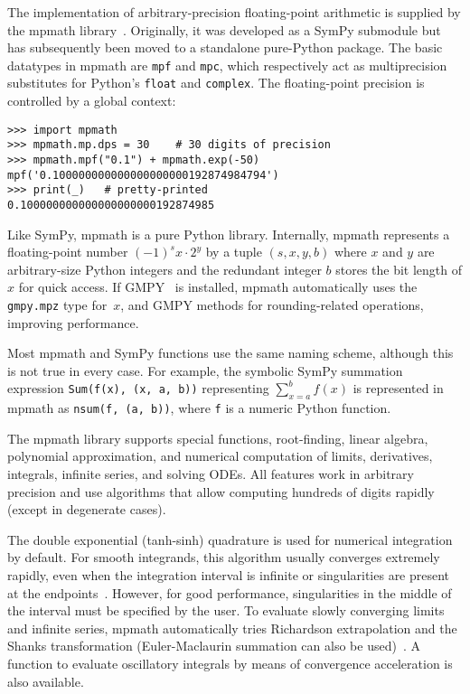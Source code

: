 The implementation of arbitrary-precision floating-point arithmetic is
supplied by the mpmath library~\cite{mpmath}. Originally, it was developed as a SymPy
submodule but has subsequently been moved to a standalone pure-Python package.
The basic datatypes in mpmath are \texttt{mpf} and \texttt{mpc}, which
respectively act as multiprecision substitutes for Python's \texttt{float} and
\texttt{complex}. The floating-point precision is controlled by a global
context:

\begin{verbatim}
>>> import mpmath
>>> mpmath.mp.dps = 30    # 30 digits of precision
>>> mpmath.mpf("0.1") + mpmath.exp(-50)
mpf('0.100000000000000000000192874984794')
>>> print(_)   # pretty-printed
0.100000000000000000000192874985
\end{verbatim}

Like SymPy, mpmath is a pure Python library.
Internally, mpmath represents a floating-point number
${(-1)}^s x \cdot 2^y$ by a tuple $(s, x, y, b)$ where
$x$ and $y$ are arbitrary-size Python integers
and the redundant integer $b$ stores the bit length of $x$ for quick access.
If GMPY~\cite{GMPY} is installed, mpmath automatically uses
the \texttt{gmpy.mpz} type for~$x$, and GMPY methods
for rounding-related operations, improving performance.

Most mpmath and SymPy functions use the same naming scheme, although this is
not true in every case. For example, the symbolic SymPy summation expression
\texttt{Sum(f(x), (x, a, b))} representing $\sum_{x=a}^b f(x)$ is represented
in mpmath as \texttt{nsum(f, (a, b))}, where \texttt{f} is a numeric Python
function.

The mpmath library supports
special functions, root-finding, linear algebra, polynomial approximation,
and numerical computation of limits, derivatives, integrals, infinite
series, and solving ODEs. All features work in arbitrary precision
and use algorithms that allow computing hundreds of digits rapidly
(except in degenerate cases).

The double exponential (tanh-sinh) quadrature is used for numerical
integration by default. For smooth integrands, this algorithm usually
converges extremely rapidly, even when the integration interval is infinite
or singularities are present at the endpoints~\cite{takahasi1974double,bailey2005comparison}.
However, for good performance, singularities
in the middle of the interval must be specified
by the user.
To evaluate slowly converging limits and infinite series, mpmath
automatically tries Richardson extrapolation and the
Shanks transformation
(Euler-Maclaurin summation can also be used)~\cite{BenderOrszag1999}.
A function to evaluate oscillatory integrals by means of convergence
acceleration is also available.


